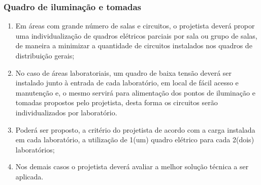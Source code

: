 \subsubsection{Quadro de iluminação e tomadas}\label{switchboard: iluminacao}

\begin{enumerate}
	
	\item Em áreas com grande número de salas e circuitos, o projetista deverá propor uma individualização de quadros elétricos parciais por sala ou grupo de salas, de maneira a minimizar a quantidade de circuitos instalados nos quadros de distribuição gerais;
	
	\item No caso de áreas laboratoriais, um quadro de baixa tensão deverá ser instalado junto à entrada de cada laboratório, em local de fácil acesso e manutenção e, o mesmo servirá para alimentação dos pontos de iluminação e tomadas propostos pelo projetista, desta forma os circuitos serão individualizados por laboratório.
	
	\item Poderá ser proposto, a critério do projetista de acordo com a carga instalada em cada laboratório, a utilização de 1(um) quadro elétrico para cada 2(dois) laboratórios;
	
	\item Nos demais casos o projetista deverá avaliar a melhor solução técnica a ser aplicada.
	
\end{enumerate}